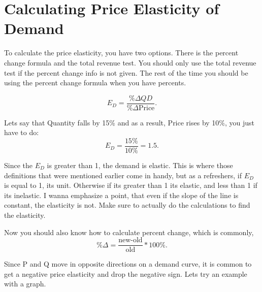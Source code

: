 \section{Calculating Price Elasticity of Demand}
To calculate the price elasticity, you have two options. There is the percent change formula and the total revenue test. You should only use the total revenue test if the percent change info is not given. The rest of the time you should be using the percent change formula when you have percents. 
\begin{definition}
    \[
        E_D = \frac{\%\Delta QD}{\%\Delta\text{Price}}
    .\] 
\end{definition}

Lets say that Quantity falls by 15\% and as a result, Price rises by 10\%, you just have to do:
\[
    E_D  = \frac{15\%}{10\%} = 1.5
.\] 

Since the $E_D$ is greater than 1, the demand is elastic. This is where those definitions that were mentioned earlier come in handy, but as a refreshers, if $E_D$ is equal to 1, its unit. Otherwise if its greater than 1 its elastic, and less than 1 if its inelastic. I wanna emphasize a point, that even if the slope of the line is constant, the elasticity is not. Make sure to actually do the calculations to find the elasticity.

Now you should also know how to calculate percent change, which is commonly, 
 \[
     \%\Delta = \frac{\text{new-old}}{\text{old}} * 100\%
.\] 

Since P and Q move in opposite directions on a demand curve, it is common to get a negative price elasticity and drop the negative sign. Lets try an example with a graph. 

\begin{figure}[h!]
\begin{center}
\end{center}
\end{figure}


